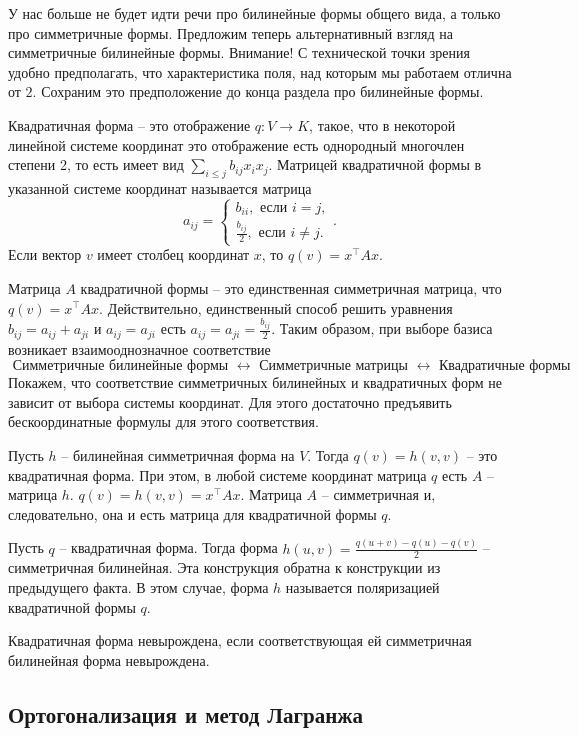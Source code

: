 У нас больше не будет идти речи про билинейные формы общего вида, а только про симметричные формы. Предложим теперь альтернативный взгляд на симметричные билинейные формы. {\color{red} Внимание!} С технической точки зрения удобно предполагать, что характеристика поля, над которым мы работаем отлична от $2$. Сохраним это предположение до конца раздела про билинейные формы.

\dfn Квадратичная форма -- это отображение $q\colon V \to K$, такое, что в некоторой линейной системе координат это отображение есть однородный многочлен степени 2, то есть имеет вид $\sum_{i\leq j} b_{ij} x_i x_j$. Матрицей квадратичной формы в указанной системе координат называется матрица $$a_{ij}=\begin{cases} b_{ii}, \text{ если $i=j$},\\
\frac{b_{ij}}{2}, \text{ если $i\neq j$}.
\end{cases}.$$
Если вектор $v$ имеет столбец координат $x$, то $q(v)=x^{\top}Ax$.
\edfn

Матрица $A$ квадратичной формы -- это единственная симметричная матрица, что $q(v)=x^{\top} A x$. Действительно, единственный способ решить уравнения $b_{ij}=a_{ij}+a_{ji}$ и $a_{ij}=a_{ji}$  есть $a_{ij}=a_{ji}=\frac{b_{ij}}{2}$.
Таким образом, при выборе базиса возникает взаимооднозначное соответствие 
$$\text{ Симметричные билинейные формы } \leftrightarrow \text{ Симметричные матрицы } \leftrightarrow \text{ Квадратичные формы } $$
Покажем, что соответствие симметричных билинейных и квадратичных форм не зависит от выбора системы координат. Для этого достаточно предъявить бескоординатные формулы для этого соответствия.


\utv Пусть $h$ -- билинейная симметричная форма на $V$. Тогда $q(v)=h(v,v)$ -- это квадратичная форма. При этом, в любой системе координат матрица $q$ есть $A$ -- матрица $h$.
\proof $q(v)=h(v,v)= x^{\top}Ax$. Матрица $A$ -- симметричная и, следовательно, она и есть матрица для квадратичной формы $q$.
\eutv




\rm
Пусть $q$ -- квадратичная форма. Тогда форма $h(u,v)=\frac{q(u+v)-q(u)-q(v)}{2}$ -- симметричная билинейная. Эта конструкция обратна к конструкции из предыдущего факта. В этом случае, форма $h$ называется поляризацией квадратичной формы $q$.
\erm 


\dfn Квадратичная форма невырождена, если соответствующая ей симметричная билинейная форма невырождена.
\edfn

\subsection{Ортогонализация и метод Лагранжа}


